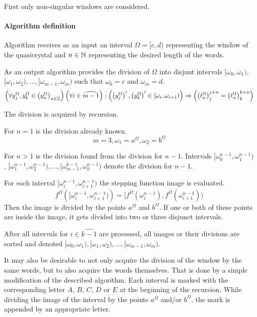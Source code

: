 \documentclass[text.tex]{subfiles}
\begin{document}
First only non-singular windows are considered.

\paragraph{Algorithm definition}
Algorithm receives as an input an interval $\Omega = [c,d)$ representing the window of the quasicrystal and $n\in\mathbb{N}$ representing the desired length of the words.

As an output algorithm provides the division of $\Omega$ into disjunt intervals $[\omega_0,\omega_1)$, $[\omega_1,\omega_2), \dots, [\omega_{m-1},\omega_m)$ such that $\omega_0 = c$ and $\omega_m = d$.
$$\left(\forall y_j^\Omega,y_k^\Omega\in\left(y_n^\Omega\right)_{n\in\mathbb{Z}} \right)\left(\forall i\in\widehat{m-1}\right): \left(\left({y_j^\Omega}\right)',\left({y_k^\Omega}\right)' \in [\omega_i,\omega_{i+1})\right) \Rightarrow \left(\left(t_n^\Omega\right)_j^{j+n} = \left(t_n^\Omega\right)_k^{k+n}\right)$$

The division is acquired by recursion. 

For $n=1$ is the division already known.
$$m=3, \omega_1 = a^\Omega, \omega_2 = b^\Omega$$

For $n>1$ is the division found from the division for $n-1$.
Intervals 
$[\omega_0^{n-1},\omega_1^{n-1})$, $[\omega_1^{n-1},\omega_2^{n-1}), \dots, [\omega_{m-1}^{k-1},\omega_{k}^{n-1})$ denote the division for $n-1$.

For each interval $[\omega_i^{n-1},\omega_{i+1}^{n-1})$ the stepping function image is evaluated. 
$$f^\Omega\left([\omega_i^{n-1},\omega_{i+1}^{n-1})\right) = [f^\Omega(\omega_i^{n-1}),f^\Omega(\omega_{i+1}^{n-1}))$$
Then the image is divided by the points $a^\Omega$ and $b^\Omega$. If one or both of these points are inside the image, it gets divided into two or three disjunct intervals. 

After all intervals for $i\in \widehat{k-1}$ are processed, all images or their divisions are sorted and denoted $[\omega_0,\omega_1), [\omega_1,\omega_2), \dots, [\omega_{m-1},\omega_m)$.

It may also be desirable to not only acquire the division of the window by the same words, but to also acquire the words themselves. That is done by a simple modification of the described algorithm. Each interval is marked with the corresponding letter $A$, $B$, $C$, $D$ or $E$ at the beginning of the recursion. While dividing the image of the interval by the points $a^\Omega$ and/or $b^\Omega$, the mark is appended by an appropriate letter.
\end{document}
